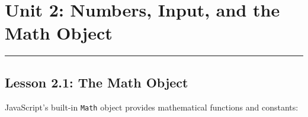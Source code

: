 \documentclass[
  justified,
  openright,
]{tufte-book}
\begin{document}
\newpage

\section{Unit 2: Numbers, Input, and the Math
Object}\label{unit-2-numbers-input-and-the-math-object}

\begin{center}\rule{0.5\linewidth}{0.5pt}\end{center}

\subsection{Lesson 2.1: The Math
Object}\label{lesson-2.1-the-math-object}

JavaScript's built-in \texttt{Math} object provides mathematical
functions and constants:
\end{document}
